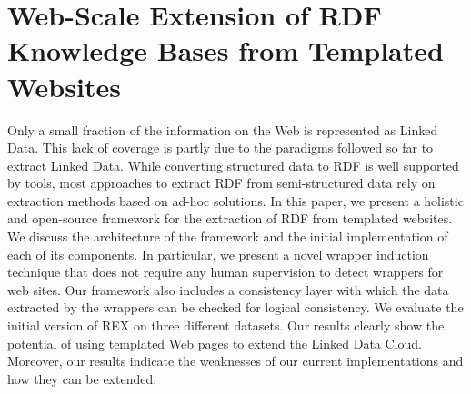 

%
 

\chapter{Web-Scale Extension of RDF Knowledge Bases from Templated Websites}



Only a small fraction of the information on the Web is represented as Linked Data.
This lack of coverage is partly due to the paradigms followed so far to extract Linked Data. 
While converting structured data to RDF is well supported by tools, most approaches to extract RDF from semi-structured data rely on extraction methods based on ad-hoc solutions. 
In this paper, we present a holistic and open-source framework for the extraction of RDF from templated websites.
We discuss the architecture of the framework and the initial implementation of each of its components.
In particular, we present a novel wrapper induction technique that does not require any human supervision to detect wrappers for web sites. 
Our framework also includes a consistency layer with which the data extracted by the wrappers can be checked for logical consistency.
We evaluate the initial version of REX on three different datasets. 
Our results clearly show the potential of using templated Web pages to extend the Linked Data Cloud.
Moreover, our results indicate the weaknesses of our current implementations and how they can be extended.

